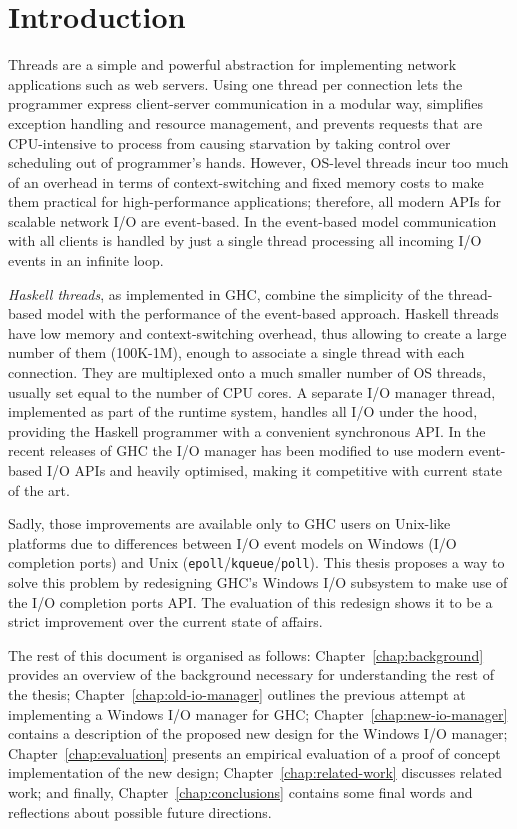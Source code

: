 \documentclass[a4paper,11pt,oneside]{report}
\begin{document}
\chapter{Introduction}

Threads are a simple and powerful abstraction for implementing network
applications such as web servers. Using one thread per connection lets the
programmer express client-server communication in a modular way, simplifies
exception handling and resource management, and prevents requests that are
CPU-intensive to process from causing starvation by taking control over
scheduling out of programmer's hands. However, OS-level threads incur too much
of an overhead in terms of context-switching and fixed memory costs to make them
practical for high-performance applications; therefore, all modern APIs for
scalable network I/O are event-based. In the event-based model communication
with all clients is handled by just a single thread processing all incoming I/O
events in an infinite loop.

\textit{Haskell threads}, as implemented in GHC, combine the simplicity of the
thread-based model with the performance of the event-based approach. Haskell
threads have low memory and context-switching overhead, thus allowing to create
a large number of them (100K-1M), enough to associate a single thread with each
connection. They are multiplexed onto a much smaller number of OS threads,
usually set equal to the number of CPU cores. A separate I/O manager thread,
implemented as part of the runtime system, handles all I/O under the hood,
providing the Haskell programmer with a convenient synchronous API. In the
recent releases of GHC the I/O manager has been modified to use modern
event-based I/O APIs and heavily optimised, making it competitive with current
state of the art.

Sadly, those improvements are available only to GHC users on Unix-like platforms
due to differences between I/O event models on Windows (I/O completion ports)
and Unix (\texttt{epoll}/\texttt{kqueue}/\texttt{poll}). This thesis proposes a
way to solve this problem by redesigning GHC's Windows I/O subsystem to make use
of the I/O completion ports API. The evaluation of this redesign shows it to be
a strict improvement over the current state of affairs.

The rest of this document is organised as follows: Chapter~\ref{chap:background}
provides an overview of the background necessary for understanding the rest of
the thesis; Chapter~\ref{chap:old-io-manager} outlines the previous attempt at
implementing a Windows I/O manager for GHC; Chapter~\ref{chap:new-io-manager}
contains a description of the proposed new design for the Windows I/O manager;
Chapter~\ref{chap:evaluation} presents an empirical evaluation of a proof of
concept implementation of the new design; Chapter~\ref{chap:related-work}
discusses related work; and finally, Chapter~\ref{chap:conclusions} contains
some final words and reflections about possible future directions.
\end{document}
